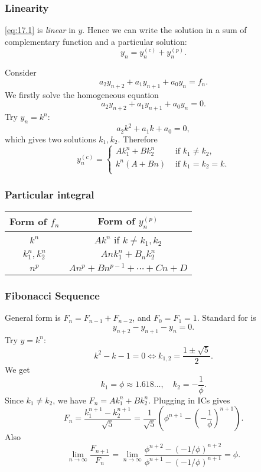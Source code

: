 \documentclass[a4paper]{article}
\begin{document}
      \subsubsection{Linearity}
      \ref{eq:17.1} is \textit{linear} in $y$. Hence we can write the solution in a sum of complementary function and a particular solution:
      \[
          y_n=y_n^{(c)}+y_n^{(p)}
      .\]
      \begin{example}
          Consider
          \[
              a_2y_{n+2}+a_1y_{n+1}+a_0y_n=f_n
          .\]
          We firstly solve the homogeneous equation 
          \[
            a_2y_{n+2}+a_1y_{n+1}+a_0y_n=0
          .\]
          Try $y_n=k^n$: 
          \[
              a_2k^2+a_1k+a_0=0
          ,\]
          which gives two solutions $k_1,k_2$. Therefore 
        \[
            y_n^{(c)}=\begin{cases}
            Ak_1^n+Bk_2^n &\text{ if }k_1\neq k_2,\\
            k^n(A+Bn) &\text{ if }k_1=k_2=k.\\
            \end{cases} 
        \]
      \end{example}
      \subsubsection{Particular integral}
      \begin{center}
        \begin{tabular}{cc}
        \toprule
        Form of $f_n$ & Form of $y_n^{(p)}$ \\ \midrule
        $ k^n $ & $ Ak^n $ if $ k\neq k_1,k_2 $ \\
        $ k_1^n, k_2^n $ & $ Ank_1^n+B_nk_2^n $ \\
        $ n^p $ & $ An^p+Bn^{p-1}+\cdots+Cn+D$ \\ \bottomrule
        \end{tabular}
    \end{center}
    \subsubsection{Fibonacci Sequence}
    General form is $ F_n=F_{n-1}+F_{n-2} $, and $ F_0=F_1=1 $. Standard for is 
    \[
        y_{n+2}-y_{n+1}-y_n=0
    .\]
    Try $y=k^n$:
    \[
        k^2-k-1=0 \Longleftrightarrow k_{1,2}=\frac{1\pm \sqrt{5}}{2}
    .\]
    We get 
    \[
        k_1=\phi\approx 1.618\dots,\quad k_2=-\frac{1}{\phi}
    .\]
    Since $k_1\neq k_2$, we have $ F_n=Ak_1^{n}+Bk_2^n $. Plugging in ICs gives 
    \[
        F_n = \frac{k_1^{n+1}-k_2^{n+1}}{\sqrt{5}} = \frac{1}{\sqrt{5}}\left( \phi^{n+1}-\left( -\frac{1}{\phi} \right)^{n+1} \right)
    .\]
    Also 
    \[
        \lim_{n \to \infty} \frac{F_{n+1}}{F_n} = \lim_{n \to \infty} \frac{\phi^{n+2}-(-1/\phi)^{n+2}}{\phi^{n+1}-(-1/\phi)^{n+1}}=\phi
    .\]
\end{document}
